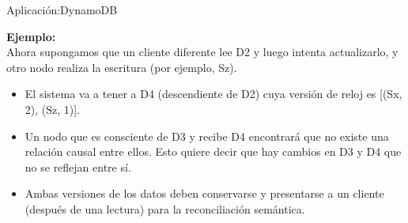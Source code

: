 \begin{frame}[fragile]{Aplicación:}{DynamoDB}
    \justifying

    {\bf Ejemplo:}\\[0.3cm]

    Ahora supongamos que un cliente diferente lee D2 y luego intenta actualizarlo,
    y otro nodo realiza la escritura (por ejemplo, Sz).

\begin{itemize}
\item El sistema va a tener a D4 (descendiente de D2) cuya versión de reloj es
[(Sx, 2), (Sz, 1)].

\item Un nodo que es consciente de D3 y recibe D4 encontrará que no existe una
relación causal entre ellos. Esto quiere decir que hay cambios en D3 y D4 que
no se reflejan entre sí.

\item Ambas versiones de los datos deben conservarse y presentarse a un cliente
(después de una lectura) para la reconciliación semántica.

\end{itemize}

\end{frame}
